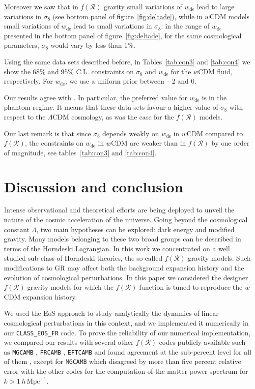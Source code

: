\documentclass[nofootinbib,a4paper,aps,prd,10pt,superscriptaddress,reprint,showkeys,showpacs]{revtex4-1}
\newcommand{\qsubrm}[2]{{#1}_{\scriptscriptstyle{\textrm{#2}}}}
\begin{document}
Moreover we saw that in $f(\mathcal{R})$ gravity small variations of $\qsubrm{w}{de}$ lead to large variations in 
$\qsubrm{\sigma}{8}$ (see bottom panel of figure~\ref{fig:deltade}), while in $w$CDM models small variations of 
$\qsubrm{w}{de}$ lead to small variations in $\qsubrm{\sigma}{8}$: in the range of $\qsubrm{w}{de}$ presented in the 
bottom panel of figure~\ref{fig:deltade}, for the same cosmological parameters, $\qsubrm{\sigma}{8}$ would vary by less 
than 1\%.

Using the same data sets described before, in Tables~\ref{tab:con3} and \ref{tab:con4} we show the 68\% and 95\% C.L. 
constraints on $\qsubrm{\sigma}{8}$ and $\qsubrm{w}{de}$ for the $w$CDM fluid, respectively. For $\qsubrm{w}{de}$, we 
use a uniform prior between $-2$ and $0$.

Our results agree with \cite{Planck2016_XIII}. In particular, the preferred value for $\qsubrm{w}{de}$ is in the 
phantom regime. It means that these data sets favour a higher value of $\qsubrm{\sigma}{8}$ with respect to the 
$\Lambda$CDM cosmology, as was the case for the $f(\mathcal{R})$ models.

Our last remark is that since $\qsubrm{\sigma}{8}$ depends weakly on $\qsubrm{w}{de}$ in $w$CDM compared to 
$f(\mathcal{R})$, the constraints on $\qsubrm{w}{de}$ in $w$CDM are weaker than in $f(\mathcal{R})$ by one order of 
magnitude, see tables~\ref{tab:con3} and \ref{tab:con4}.


\section{Discussion and conclusion}\label{sect:conclusion}
Intense observational and theoretical efforts are being deployed to unveil the nature of the cosmic acceleration of the 
universe. Going beyond the cosmological constant $\Lambda$, two main hypotheses can be explored: dark energy and 
modified gravity. Many models belonging to these two broad groups can be described in terms of the Horndeski 
Lagrangian. In this work we concentrated on a well studied sub-class of Horndeski theories, the so-called 
$f(\mathcal{R})$ gravity models. Such modifications to GR may affect both the background expansion history and the 
evolution of cosmological perturbations. 
In this paper we considered the designer $f(\mathcal{R})$ gravity models for which the $f(\mathcal{R})$ function is 
tuned to reproduce the $w$CDM expansion history.

We used the EoS approach to study analytically the dynamics of linear cosmological perturbations in this context, and 
we implemented it numerically in our \verb|CLASS_EOS_FR| code. 
To prove the reliability of our numerical implementation, we compared our results with several other $f(\mathcal{R})$ 
codes publicly available such as \verb|MGCAMB| \citep{Zhao2009a,Hojjati2011}, \verb|FRCAMB| \citep{He2012}, 
\verb|EFTCAMB| \citep{Hu2014a,Raveri2014,Hu2014b} and found agreement at the sub-percent level for all of them 
\citep{Bellini2018}, except for \verb|MGCAMB| which disagreed by more than five percent relative error with the other 
codes for the computation of the matter power spectrum for $k> 1~h\,\mathrm{Mpc}^{-1}$.
\end{document}
